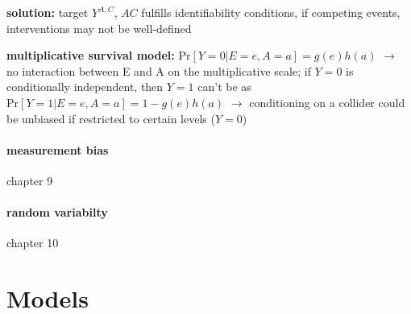 \documentclass[8pt,oneside]{extarticle}
\begin{document}
\begin{multicols}{2}
\noindent \textbf{solution:} target $Y^{A, C}$, $AC$ fulfills identifiability conditions, \newline
 if competing events, interventions may not be well-defined


\noindent \textbf{multiplicative survival model:} $\mathrm{Pr}\left[Y{=}0|E{=}e, A{=}a\right]{=}g(e)h(a)$
$\rightarrow$ no interaction between E and A on the multiplicative scale; \newline
if $Y=0$ is conditionally independent, then $Y=1$ can't be as $\mathrm{Pr}\left[Y{=}1|E{=}e, A{=}a\right]{=}1-g(e)h(a)$
$\rightarrow$ conditioning on a collider could be unbiased if restricted to certain levels ($Y=0$)












\paragraph{measurement bias} chapter 9

\vspace{30em}

\paragraph{random variabilty} chapter 10




\end{multicols}





\section{Models}
\end{document}
